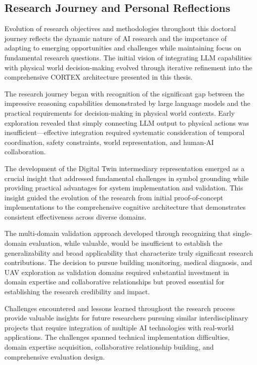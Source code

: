 \subsection{Research Journey and Personal Reflections}

Evolution of research objectives and methodologies throughout this doctoral journey reflects the dynamic nature of AI research and the importance of adapting to emerging opportunities and challenges while maintaining focus on fundamental research questions. The initial vision of integrating LLM capabilities with physical world decision-making evolved through iterative refinement into the comprehensive CORTEX architecture presented in this thesis.

The research journey began with recognition of the significant gap between the impressive reasoning capabilities demonstrated by large language models and the practical requirements for decision-making in physical world contexts. Early exploration revealed that simply connecting LLM output to physical actions was insufficient—effective integration required systematic consideration of temporal coordination, safety constraints, world representation, and human-AI collaboration.

The development of the Digital Twin intermediary representation emerged as a crucial insight that addressed fundamental challenges in symbol grounding while providing practical advantages for system implementation and validation. This insight guided the evolution of the research from initial proof-of-concept implementations to the comprehensive cognitive architecture that demonstrates consistent effectiveness across diverse domains.

The multi-domain validation approach developed through recognizing that single-domain evaluation, while valuable, would be insufficient to establish the generalizability and broad applicability that characterize truly significant research contributions. The decision to pursue building monitoring, medical diagnosis, and UAV exploration as validation domains required substantial investment in domain expertise and collaborative relationships but proved essential for establishing the research credibility and impact.

Challenges encountered and lessons learned throughout the research process provide valuable insights for future researchers pursuing similar interdisciplinary projects that require integration of multiple AI technologies with real-world applications. The challenges spanned technical implementation difficulties, domain expertise acquisition, collaborative relationship building, and comprehensive evaluation design.

